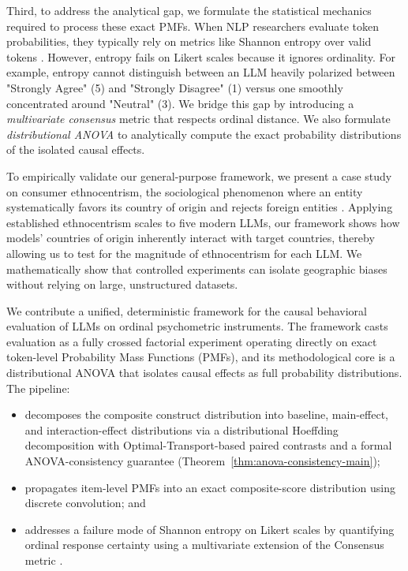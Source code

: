 Third, to address the analytical gap, we formulate the statistical mechanics required to process these exact PMFs. When NLP researchers evaluate token probabilities, they typically rely on metrics like Shannon entropy over valid tokens \citep{farquhar2024detecting}. However, entropy fails on Likert scales because it ignores ordinality. For example, entropy cannot distinguish between an LLM heavily polarized between "Strongly Agree" (5) and "Strongly Disagree" (1) versus one smoothly concentrated around "Neutral" (3). We bridge this gap by introducing a \emph{multivariate consensus} metric that respects ordinal distance. We also formulate \emph{distributional ANOVA} to analytically compute the exact probability distributions of the isolated causal effects.

To empirically validate our general-purpose framework, we present a case study on consumer ethnocentrism, the sociological phenomenon where an entity systematically favors its country of origin and rejects foreign entities \citep{shankarmahesh2006consumer}. Applying established ethnocentrism scales to five modern LLMs, our framework shows how models' countries of origin inherently interact with target countries, thereby allowing us to test for the magnitude of ethnocentrism for each LLM. We mathematically show that controlled experiments can isolate geographic biases without relying on large, unstructured datasets.


We contribute a unified, deterministic framework for the causal behavioral
evaluation of LLMs on ordinal psychometric instruments.
The framework casts evaluation as a fully crossed factorial experiment operating
directly on exact token-level Probability Mass Functions (PMFs), and its
methodological core is a distributional ANOVA that isolates causal effects
as full probability distributions. 
The pipeline:
\begin{itemize}
    \item decomposes the composite construct distribution into baseline, main-effect, and interaction-effect distributions via a distributional
    Hoeffding decomposition with Optimal-Transport-based paired contrasts and a formal ANOVA-consistency guarantee (Theorem~\ref{thm:anova-consistency-main});
    \item propagates item-level PMFs into an exact composite-score distribution using discrete convolution; and
    \item addresses a failure mode of Shannon entropy on Likert scales by quantifying ordinal response certainty using a multivariate extension of the Consensus metric \citep{tastle2007consensus}.
\end{itemize}


